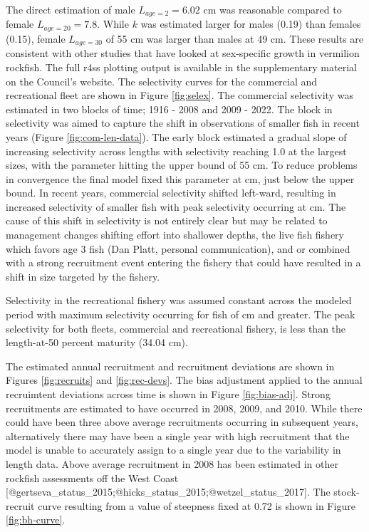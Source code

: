 \documentclass[11pt,
  english,
  letterpaper,
]{article}
\begin{document}
The direct estimation of male \(L_{age=2}=6.02\) cm was reasonable compared to female \(L_{age=20}=7.8\). While \(k\) was estimated larger for males (0.19) than females (0.15), female \(L_{age=30}\) of 55 cm was larger than males at 49 cm. These results are consistent with other studies that have looked at sex-specific growth in vermilion rockfish. The full r4ss plotting output is available in the supplementary material on the Council's website. The selectivity curves for the commercial and recreational fleet are shown in Figure \ref{fig:selex}. The commercial selectivity was estimated in two blocks of time; 1916 - 2008 and 2009 - 2022. The block in selectivity was aimed to capture the shift in observations of smaller fish in recent years (Figure \ref{fig:com-len-data}). The early block estimated a gradual slope of increasing selectivity across lengths with selectivity reaching 1.0 at the largest sizes, with the parameter hitting the upper bound of 55 cm. To reduce problems in convergence the final model fixed this parameter at cm, just below the upper bound. In recent years, commercial selectivity shifted left-ward, resulting in increased selectivity of smaller fish with peak selectivity occurring at cm. The cause of this shift in selectivity is not entirely clear but may be related to management changes shifting effort into shallower depths, the live fish fishery which favors age 3 fish (Dan Platt, personal communication), and or combined with a strong recruitment event entering the fishery that could have resulted in a shift in size targeted by the fishery.

Selectivity in the recreational fishery was assumed constant across the modeled period with maximum selectivity occurring for fish of cm and greater. The peak selectivity for both fleets, commercial and recreational fishery, is less than the length-at-50 percent maturity (34.04 cm).

The estimated annual recruitment and recruitment deviations are shown in Figures \ref{fig:recruits} and \ref{fig:rec-devs}. The bias adjustment applied to the annual recruimtent deviations across time is shown in Figure \ref{fig:bias-adj}. Strong recruitments are estimated to have occurred in 2008, 2009, and 2010. While there could have been three above average recruitments occurring in subsequent years, alternatively there may have been a single year with high recruitment that the model is unable to accurately assign to a single year due to the variability in length data. Above average recruitment in 2008 has been estimated in other rockfish assessments off the West Coast {[}@gertseva\_status\_2015;@hicks\_status\_2015;@wetzel\_status\_2017{]}. The stock-recruit curve resulting from a value of steepness fixed at 0.72 is shown in Figure \ref{fig:bh-curve}.
\end{document}

